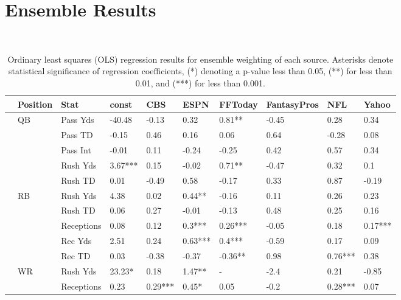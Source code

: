 \documentclass[12pt]{article}
\begin{document}
\pagebreak
\section{Ensemble Results}


﻿\begin{table}[H]
\caption{Ordinary least squares (OLS) regression results for ensemble weighting of each source. Asterisks denote statistical significance of regression coefficients, (*) denoting a p-value less than 0.05, (**) for less than 0.01, and (***) for less than 0.001.}
\centering
\begin{adjustbox}{width =\textwidth}
\begin{tabular}{llllllllll}
\toprule
{} & Position &        Stat &    const &      CBS &     ESPN &  FFToday & FantasyPros &      NFL &    Yahoo \\
\midrule
{} &       QB &    Pass Yds &   -40.48 &    -0.13 &     0.32 &   0.81** &       -0.45 &     0.28 &     0.34 \\
{} &          &     Pass TD &    -0.15 &     0.46 &     0.16 &     0.06 &        0.64 &    -0.28 &     0.08 \\
{} &          &    Pass Int &    -0.01 &     0.11 &    -0.24 &    -0.25 &        0.42 &     0.57 &     0.34 \\
{} &          &    Rush Yds &  3.67*** &     0.15 &    -0.02 &   0.71** &       -0.47 &     0.32 &      0.1 \\
{} &          &     Rush TD &     0.01 &    -0.49 &     0.58 &    -0.17 &        0.33 &     0.87 &    -0.19 \\
{} &       RB &    Rush Yds &     4.38 &     0.02 &   0.44** &    -0.16 &        0.11 &     0.26 &     0.23 \\
{} &          &     Rush TD &     0.06 &     0.27 &    -0.01 &    -0.13 &        0.48 &     0.25 &     0.16 \\
{} &          &  Receptions &     0.08 &     0.12 &   0.3*** &  0.26*** &       -0.05 &     0.18 &  0.17*** \\
{} &          &     Rec Yds &     2.51 &     0.24 &  0.63*** &   0.4*** &       -0.59 &     0.17 &     0.09 \\
{} &          &      Rec TD &     0.03 &    -0.38 &    -0.37 &  -0.36** &        0.98 &  0.76*** &     0.38 \\
{} &       WR &    Rush Yds &   23.23* &     0.18 &   1.47** &        - &        -2.4 &     0.21 &    -0.85 \\
{} &          &  Receptions &     0.23 &  0.29*** &    0.45* &     0.05 &        -0.2 &  0.28*** &     0.07 \\

\end{tabular}
\end{adjustbox}
\end{table}
\end{document}
